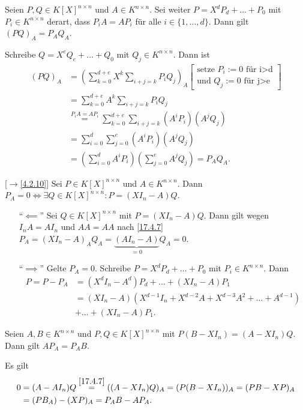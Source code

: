 \documentclass[../../main.tex]{subfiles}
\begin{document}
\begin{lem}\label{17.4.7}
Seien $P,Q\in K[X]^{n\times n}$ und $A\in K^{n\times n}$. Sei weiter $P=X^dP_d+\ldots +P_0$ mit $P_i\in K^{n\times n}$ derart, dass $P_iA=AP_i$ für alle $i\in\{1,\ldots ,d\}$. Dann gilt $(PQ)_A=P_AQ_A$.
\end{lem}
\begin{cproof}
Schreibe $Q=X^eQ_e+\ldots +Q_0$ mit $Q_j\in K^{n\times n}$. Dann ist
\begin{align*}
(PQ)_A&=\left(\sum_{k=0}^{d+e}X^k\sum_{i+j=k}P_iQ_j\right)_A\left[\begin{matrix}\text{setze }P_i:=0\text{ für i>d}\\\text{und }Q_j:=0\text{ für j>e}\end{matrix}\right]\\
&=\sum_{k=0}^{d+e}A^k\sum_{i+j=k}P_iQ_j\\
&\stackrel{P_iA=AP_i}{=}\sum_{k=0}^{d+e}\sum_{i+j=k}(A^iP_i)(A^jQ_j)\\
&=\sum_{i=0}^d\sum_{j=0}^e(A^i P_i)(A^j Q_j)\\
&=\left(\sum_{i=0}^d A^iP_i\right)\left(\sum_{j=0}^e A^jQ_j\right)=P_AQ_A.
\end{align*}
\end{cproof}

\begin{lem}\mbox{}[$\to$\ref{4.2.10}]
\label{17.4.8}
Sei $P\in K[X]^{n\times n}$ und $A\in K^{n\times n}$. Dann $P_A=0\Longleftrightarrow \exists Q\in K[X]^{n\times n}: P=(XI_n-A)Q$.
\end{lem}
\begin{cproof}
\begin{itemize}
\item[\enquote{$\impliedby$}] Sei $Q\in K[X]^{n\times n}$ mit $P=(XI_n-A)Q$. Dann gilt wegen $I_nA=AI_n$  und $AA=AA$ nach \ref{17.4.7} $P_A=(XI_n-A)_AQ_A=\underbrace{(AI_n-A)}_{=0}Q_A=0$.
\item[\enquote{$\implies$}] Gelte $P_A=0$. Schreibe $P=X^dP_d+\ldots +P_0$ mit $P_i\in K^{n\times n}$. Dann
\begin{align*}
P=P-P_A&=(X^dI_n-A^d)P_d+\ldots +(XI_n-A)P_1\\
&=(XI_n-A)(X^{d-1}I_n+X^{d-2}A+X^{d-3}A^2+\ldots +A^{d-1})\\
&+\ldots +(XI_n-A)P_1.
\end{align*}
\end{itemize}
\end{cproof}

\begin{lem}\label{17.4.9}
Seien $A,B\in K^{n\times n}$ und $P,Q\in K[X]^{n\times n}$ mit $P(B-XI_n)=(A-XI_n)Q$. Dann gilt $AP_A=P_AB$.
\end{lem}
\begin{cproof}
Es gilt
\begin{align*}
0&=(A-AI_n)Q\stackrel{\ref{17.4.7}}{=}((A-XI_n)Q)_A=(P(B-XI_n))_A=(PB-XP)_A\\
&=(PB_A)-(XP)_A=P_AB-AP_A.
\end{align*}
\end{cproof}
\end{document}
